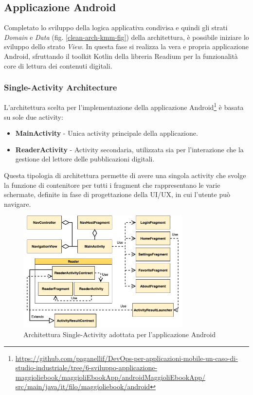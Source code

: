 \subsection{Applicazione Android}
Completato lo sviluppo della logica applicativa condivisa e quindi gli strati \textit{Domain} e \textit{Data} (fig. \ref{clean-arch-kmm-fig}) della architettura, è possibile iniziare lo sviluppo dello strato \textit{View}. In questa fase si realizza la vera e propria applicazione Android, sfruttando il toolkit Kotlin della libreria Readium per la funzionalità core di lettura dei contenuti digitali.

\subsubsection*{Single-Activity Architecture}
L'architettura scelta per l'implementazione della applicazione Android\footnote{\href{https://github.com/paganellif/DevOps-per-applicazioni-mobile-un-caso-di-studio-industriale/tree/6-sviluppo-applicazione-maggioliebook/maggioliEbookApp/androidMaggioliEbookApp/src/main/java/it/filo/maggioliebook/android}{https://github.com/paganellif/DevOps-per-applicazioni-mobile-un-caso-di-studio-industriale/tree/6-sviluppo-applicazione-maggioliebook/maggioliEbookApp/androidMaggioliEbookApp/\\src/main/java/it/filo/maggioliebook/android}} è basata su sole due activity:

\begin{itemize}
    \item \textbf{MainActivity} - Unica activity principale della applicazione.
    \item \textbf{ReaderActivity} - Activity secondaria, utilizzata sia per l'interazione che la gestione del lettore delle pubblicazioni digitali.
\end{itemize}

Questa tipologia di architettura permette di avere una singola activity che svolge la funzione di contenitore per tutti i fragment che rappresentano le varie schermate, definite in fase di progettazione della UI/UX, in cui l'utente può navigare.

\begin{figure}[H]
    \centering
    \includegraphics[width=0.77\textwidth]{img/android-arch.png}
    \caption{Architettura Single-Activity adottata per l'applicazione Android}
    \label{android-arch-png}
\end{figure}

